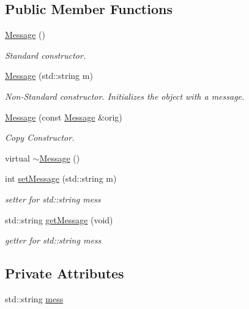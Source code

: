 \subsection*{Public Member Functions}
\begin{DoxyCompactItemize}
\item 
\mbox{\hyperlink{classMessage_a4fc4f717b634e66070366cb7722d7761}{Message}} ()
\begin{DoxyCompactList}\small\item\em Standard constructor. \end{DoxyCompactList}\item 
\mbox{\hyperlink{classMessage_ad8d8236fe10ad63103a26f84c68bcea6}{Message}} (std\+::string m)
\begin{DoxyCompactList}\small\item\em Non-\/\+Standard constructor. Initializes the object with a message. \end{DoxyCompactList}\item 
\mbox{\hyperlink{classMessage_afc0cbea76e5ed74d86af6b6646fd8642}{Message}} (const \mbox{\hyperlink{classMessage}{Message}} \&orig)
\begin{DoxyCompactList}\small\item\em Copy Constructor. \end{DoxyCompactList}\item 
virtual \mbox{\hyperlink{classMessage_a3f7275462831f787a861271687bcad67}{$\sim$\+Message}} ()
\item 
int \mbox{\hyperlink{classMessage_aa1e4c60f94308a9367ad3106c34b28f3}{set\+Message}} (std\+::string m)
\begin{DoxyCompactList}\small\item\em setter for std\+::string mess \end{DoxyCompactList}\item 
std\+::string \mbox{\hyperlink{classMessage_a8d2e67a8732ecaeca309df6ac5dda156}{get\+Message}} (void)
\begin{DoxyCompactList}\small\item\em getter for std\+::string mess \end{DoxyCompactList}\end{DoxyCompactItemize}
\subsection*{Private Attributes}
\begin{DoxyCompactItemize}
\item 
std\+::string \mbox{\hyperlink{classMessage_a71af4fd1655feab5f4986782f9c1bc92}{mess}}
\end{DoxyCompactItemize}


